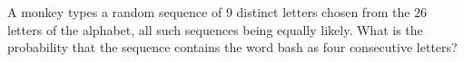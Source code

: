 A monkey types a random sequence of $9$ distinct letters chosen from the $26$ letters of the alphabet, all such sequences being equally likely. What is the probability that the sequence contains the word bash as four consecutive letters?
